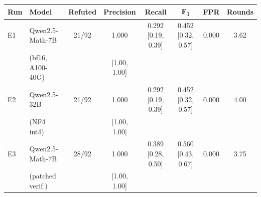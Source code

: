 \begin{tabular}{llcccccc}
\toprule
\textbf{Run} & \textbf{Model} & \textbf{Refuted} & \textbf{Precision} & \textbf{Recall} & \textbf{F\textsubscript{1}} & \textbf{FPR} & \textbf{Rounds} \\
\midrule
E1 & Qwen2.5-Math-7B  & 21/92 & 1.000        & 0.292 [0.19, 0.39] & 0.452 [0.32, 0.57] & 0.000 & 3.62 \\
   & (bf16, A100-40G) &       & [1.00, 1.00] &                    &                    &       &      \\
\addlinespace
E2 & Qwen2.5-32B      & 21/92 & 1.000        & 0.292 [0.19, 0.39] & 0.452 [0.32, 0.57] & 0.000 & 4.00 \\
   & (NF4 int4)       &       & [1.00, 1.00] &                    &                    &       &      \\
\addlinespace
E3 & Qwen2.5-Math-7B  & 28/92 & 1.000        & 0.389 [0.28, 0.50] & 0.560 [0.43, 0.67] & 0.000 & 3.75 \\
   & (patched verif.) &       & [1.00, 1.00] &                    &                    &       &      \\
\bottomrule
\end{tabular}
